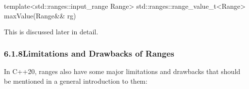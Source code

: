 \begin{cpp}
template<std::ranges::input_range Range>
std::ranges::range_value_t<Range> maxValue(Range&& rg)
\end{cpp}

This is discussed later in detail.

\subsubsection*{ 6.1.8\hspace{0.2cm}Limitations and Drawbacks of Ranges}

In C++20, ranges also have some major limitations and drawbacks that should be mentioned in a general introduction to them:

